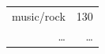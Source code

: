 \documentclass[xcolor=x11names,compress,handout]{beamer}
\begin{document}
{\begin{columns}
\begin{table}[ht]
\begin{tabular}{rr}
                music/rock &  130 \\
                \ldots & \ldots \\

\end{tabular}
\end{table}
\end{columns}}
\end{document}
